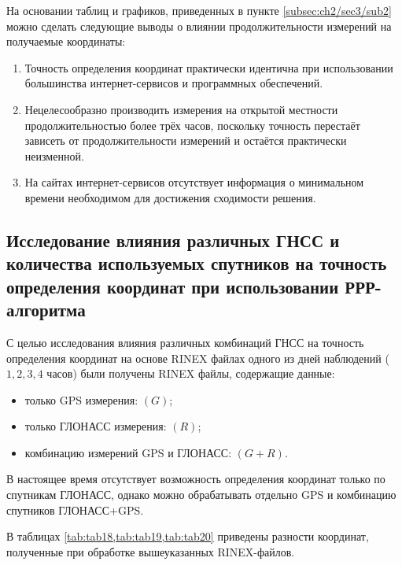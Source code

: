 На основании таблиц и графиков, приведенных в пункте \cref{subsec:ch2/sec3/sub2} можно сделать следующие выводы о влиянии продолжительности измерений на получаемые координаты:

\begin{enumerate}
	\item Точность определения координат практически идентична при использовании большинства интернет-сервисов и программных обеспечений.
	\item Нецелесообразно производить измерения на открытой местности продолжительностью более трёх часов, поскольку точность перестаёт зависеть от продолжительности измерений и остаётся практически неизменной.
	\item На сайтах интернет-сервисов отсутствует информация о минимальном времени необходимом для достижения сходимости решения.
\end{enumerate}




\subsection[Влияние используемых ГНСС и количества спутников]{Исследование влияния различных ГНСС и количества используемых спутников на точность определения координат при использовании РРР-алгоритма}\label{subsec:ch2/sec3/sub3}

С целью исследования влияния различных комбинаций ГНСС на точность определения координат на основе RINEX файлах одного из дней наблюдений ($1, 2, 3, 4$ часов) были получены RINEX файлы, содержащие данные:
\begin{itemize}
	\item только GPS измерения: $(G)$;
	\item только ГЛОНАСС измерения: $(R)$;
	\item комбинацию измерений GPS и ГЛОНАСС: $(G+R)$.
\end{itemize}
В настоящее время отсутствует возможность определения координат только по спутникам ГЛОНАСС, однако можно обрабатывать отдельно GPS и комбинацию спутников ГЛОНАСС\thinspace+\thinspace GPS.

В таблицах \cref{tab:tab18,tab:tab19,tab:tab20} приведены разности координат, полученные при обработке вышеуказанных RINEX-файлов.


